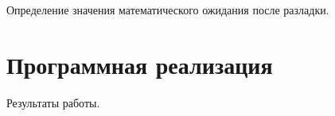 \documentclass[a4paper,14pt]{article}
\begin{document}
Определение значения математического ожидания после разладки.

\section{Программная реализация}

Результаты работы.




% 
% 
% 
% 
% 
% 
% 
% 
% 
\end{document}

